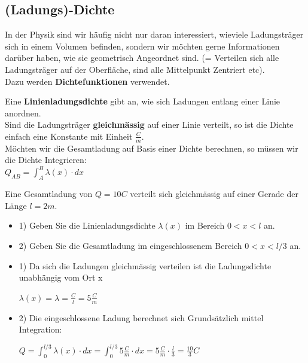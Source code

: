 \subsection{(Ladungs)-Dichte}
In der Physik sind wir häufig nicht nur daran interessiert, wieviele Ladungsträger sich in einem Volumen befinden, sondern wir möchten gerne Informationen darüber haben, wie sie geometrisch Angeordnet sind. (= Verteilen sich alle Ladungsträger auf der Oberfläche, sind alle Mittelpunkt Zentriert etc). \\
Dazu werden \textbf{Dichtefunktionen} verwendet.

\beginip
Eine \textbf{Linienladungsdichte} gibt an, wie sich Ladungen entlang einer Linie anordnen. \\
Sind die Ladungsträger \textbf{gleichmässig} auf einer Linie verteilt, so ist die Dichte einfach eine Konstante mit Einheit $\frac{C}{m}$. \\
Möchten wir die Gesamtladung auf Basis einer Dichte berechnen, so müssen wir die Dichte Integrieren: \\
\formulaBegin
	$\displaystyle Q_{AB} = \int_A^B \lambda (x) \cdot dx$
\formulaEnd
\iend

\beginbsp
	Eine Gesamtladung von $Q=10C$ verteilt sich gleichmässig auf einer Gerade der Länge $l = 2m$. \\
	\begin{itemize}
		\item 1) Geben Sie die Linienladungsdichte $\lambda(x)$ im Bereich $ 0 < x <l$ an.
		\item 2) Geben Sie die Gesamtladung im eingeschlossenem Bereich $ 0 < x < l/3$ an.
	\end{itemize}
\iend
{}
\beginbsp
\begin{itemize}
	\item 1) Da sich die Ladungen gleichmässig verteilen ist die Ladungsdichte unabhängig vom Ort x
	\begin{center}
		$\lambda(x) = \lambda = \frac{C}{l} = 5 \frac{C}{m}$
	\end{center}
	\item 2) Die eingeschlossene Ladung berechnet sich Grundsätzlich mittel Integration:
	\begin{center}
		$\displaystyle Q = \int_0^{l/3} \lambda(x) \cdot dx = \int_0^{l/3} 5 \frac{C}{m} \cdot dx = 5 \frac{C}{m} \cdot \frac{l}{3} = \frac{10}{3} C$
	\end{center}
\end{itemize}
\iend









